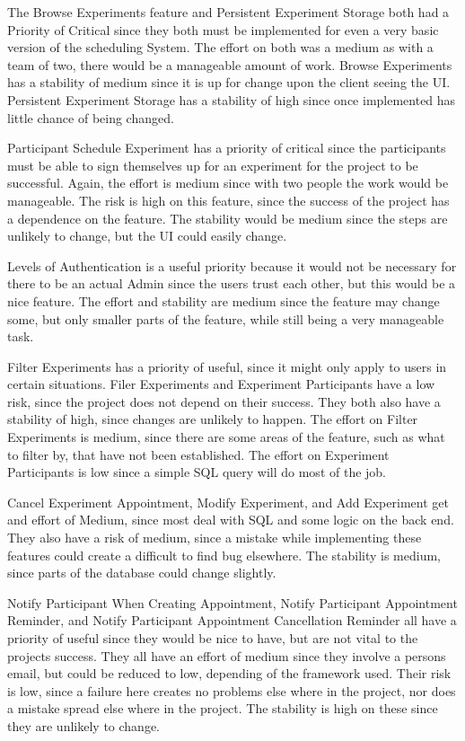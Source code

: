The Browse Experiments feature and Persistent Experiment Storage both had a Priority of Critical since they both must be implemented for even a very basic version of the scheduling System.  The effort on both was a medium as with a team of two, there would be a manageable amount of work.  Browse Experiments has a stability of medium since it is up for change upon the client seeing the UI.  Persistent Experiment Storage has a stability of high since once implemented has little chance of being changed.

Participant Schedule Experiment has a priority of critical since the participants must be able to sign themselves up for an experiment for the project to be successful.  Again, the effort is medium since with two people the work would be manageable.  The risk is high on this feature, since the success of the project has a dependence on the feature.  The stability would be medium since the steps are unlikely to change, but the UI could easily change.

Levels of Authentication is a useful priority because it would not be necessary for there to be an actual Admin since the users trust each other, but this would be a nice feature.  The effort and stability are medium since the feature may change some, but only smaller parts of the feature, while still being a very manageable task.

Filter Experiments has a priority of useful, since it might only apply to users in certain situations.  Filer Experiments and Experiment Participants have a low risk, since the project does not depend on their success.  They both also have a stability of high, since changes are unlikely to happen.  The effort on Filter Experiments is medium, since there are some areas of the feature, such as what to filter by, that have not been established.  The  effort on Experiment Participants is low since a simple SQL query will do most of the job.

Cancel Experiment Appointment, Modify Experiment, and Add Experiment get and effort of Medium, since most deal with SQL and some logic on the back end.  They also have a risk of medium, since a mistake while implementing these features could create a difficult to find bug elsewhere.  The stability is medium, since parts of the database could change slightly.

Notify Participant When Creating Appointment, Notify Participant Appointment Reminder, and Notify Participant Appointment Cancellation Reminder all have a priority of useful since they would be nice to have, but are not vital to the projects success.  They all have an effort of medium since they involve a persons email, but could be reduced to low, depending of the framework used.  Their risk is low, since a failure here creates no problems else where in the project, nor does a mistake spread else where in the project.  The stability is high on these since they are unlikely to change.

